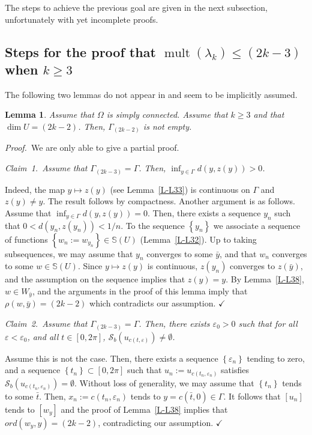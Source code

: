 \documentclass[12pt,a4paper]{amsart}
\theoremstyle{plain} %
\newtheorem{lemma}[theorem]{Lemma}
\theoremstyle{definition}
\numberwithin{equation}{section}
\numberwithin{figure}{section}
\numberwithin{table}{section}
\newcommand{\bS}{\mathbb{S}}
\newcommand{\cS}{\mathcal{S}}
\DeclareMathOperator{\mult}{mult}
\newcommand{\pf}{\emph{Proof.~}}
\newcommand{\qedc}{$\checkmark$}
\newcommand{\set}[1]{\left\lbrace #1 \right\rbrace}
\begin{document}
The steps to achieve the previous goal are given in the next subsection, unfortunately with yet incomplete proofs.

\subsection{Steps for the proof that $\mult(\lambda_k) \le (2k-3)$ when $k \ge 3$}\label{SS-hmn6-2}

The following two lemmas do not appear in \cite{HoMN1999} and seem to be implicitly assumed.

\begin{lemma}\label{L-L35b0}
Assume that $\Omega$ is simply connected. Assume that  $k \ge 3$ and that $\dim U = (2k-2)$. Then,  $\Gamma_{(2k-2)}$ is not empty.
\end{lemma}

\pf We are only able to give a partial proof.\smallskip

\emph{Claim~1.~Assume that $\Gamma_{(2k-3)} = \Gamma $.  Then, $\inf_{y\in \Gamma} d(y,z(y)) >0$.}

Indeed, the map $y \mapsto z(y)$ (see Lemma~\ref{L-L33}) is continuous on $\Gamma$ and $z(y) \neq y$. The result follows by compactness. Another argument is as follows. Assume that $\inf_{y\in \Gamma} d(y,z(y)) = 0$. Then, there exists a sequence $y_n$ such that $0 < d(y_n,z(y_n)) < 1/n$. To the sequence $\set{y_n}$ we associate a sequence of functions $\set{w_n:=w_{y_n}} \in \bS(U)$ (Lemma~\ref{L-L32}). Up to taking subsequences, we may assume that $y_n$ converges to some $\bar{y}$, and that $w_n$ converges to some $w \in \bS(U)$. Since $y \mapsto z(y)$ is continuous,  $z(y_n)$ converges to $z(\bar{y})$, and the assumption on the sequence implies that $z(y) = y$.  By Lemma~\ref{L-L38}, $w \in W_{\bar{y}}$, and the arguments in the proof of this lemma imply that $\rho(w,\bar{y}) = (2k-2)$ which contradicts our assumption. \hfill \qedc \medskip

\emph{Claim~2.~Assume that $\Gamma_{(2k-3)} = \Gamma$. Then, there exists $\varepsilon_0 > 0$ such that for all $\varepsilon < \varepsilon_0$, and all $t \in [0,2\pi]$, $\cS_b(u_{c(t,\varepsilon)}) \neq \emptyset$.}

Assume this is not the case. Then, there exists a sequence $\set{\varepsilon_n}$ tending to zero, and a sequence $\set{t_n} \subset [0,2\pi]$ such that $u_n := u_{c(t_n,\varepsilon_n)}$ satisfies $\cS_b(u_{c(t_n,\varepsilon_n)}) = \emptyset$. Without loss of generality, we may assume that $\set{t_n}$ tends to some $\bar{t}$. Then, $x_n := c(t_n,\varepsilon_n)$ tends to $y = c(\bar{t},0) \in \Gamma$. It follows that $[u_n]$ tends to $[w_y]$ and the proof of Lemma~\ref{L-L38} implies that $ord(w_y,y) = (2k-2)$, contradicting our assumption. \hfill \qedc \medskip
\end{document}

